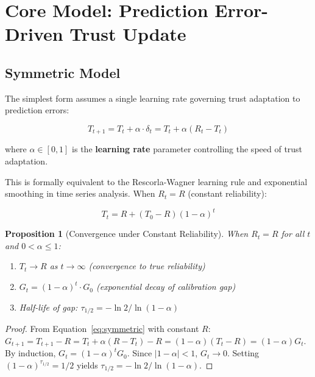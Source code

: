 \documentclass[12pt]{article}
\newtheorem{proposition}{Proposition}
\begin{document}
\section{Core Model: Prediction Error-Driven Trust Update}

\subsection{Symmetric Model}

The simplest form assumes a single learning rate governing trust
adaptation to prediction errors:

\begin{equation}
  \boxed{T_{t+1} = T_t + \alpha \cdot \delta_t = T_t + \alpha(R_t - T_t)}
  \label{eq:symmetric}
\end{equation}

where $\alpha \in [0,1]$ is the \textbf{learning rate} parameter
controlling the speed of trust adaptation.

This is formally equivalent to the Rescorla-Wagner learning rule
\citep{rescorla1972theory} and exponential smoothing in time series
analysis. When $R_t = R$ (constant reliability):

\begin{equation}
  T_t = R + (T_0 - R)(1-\alpha)^t
\end{equation}

\begin{proposition}[Convergence under Constant Reliability]
  When $R_t = R$ for all $t$ and $0 < \alpha \leq 1$:
  \begin{enumerate}
    \item $T_t \to R$ as $t \to \infty$ (convergence to true reliability)
    \item $G_t = (1-\alpha)^t \cdot G_0$ (exponential decay of calibration gap)
    \item Half-life of gap: $\tau_{1/2} = -\ln 2 / \ln(1-\alpha)$
  \end{enumerate}
\end{proposition}

\begin{proof}
  From Equation~\ref{eq:symmetric} with constant $R$:
  $G_{t+1} = T_{t+1} - R = T_t + \alpha(R - T_t) - R = (1-\alpha)(T_t - R) = (1-\alpha)G_t$.
  By induction, $G_t = (1-\alpha)^t G_0$.
  Since $|1-\alpha| < 1$, $G_t \to 0$.
  Setting $(1-\alpha)^{\tau_{1/2}} = 1/2$ yields
  $\tau_{1/2} = -\ln 2 / \ln(1-\alpha)$.
\end{proof}
\end{document}
